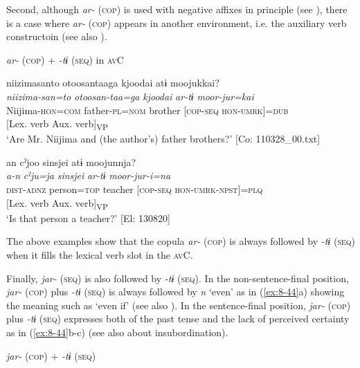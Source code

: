   Second, although \textit{ar-} (\textsc{cop}) is used with negative affixes in principle (see ), there is a case where \textit{ar-} (\textsc{cop}) appears in another environment, i.e. the auxiliary verb constructoin (see also ).

\ea\label{ex:8-43}
  \textit{ar-} (\textsc{cop}) + \textit{-tɨ} (\textsc{seq}) in \textsc{av}C

\ea
{\US}
\gllll   {\textbar}niizimasanto  otoosan{\textbar}taaga  {\textbar}kjoodai{\textbar}  atɨ  moojukkai?\\
\textit{niizima-san=to}  \textit{otoosan-taa=ga}  \textit{kjoodai}  \textit{ar-tɨ}  \textit{moor-jur=kai}\\
Niijima-\textsc{hon}=\textsc{com}  father-\textsc{pl}=\textsc{nom}  brother  [\textsc{cop}-\textsc{seq}  \textsc{hon}-\textsc{umrk}]=\textsc{dub}\\
            {}[Lex. verb  Aux. verb]\textsubscript{VP}\\
\glt ‘Are Mr. Niijima and (the author’s) father brothers?’ [Co: 110328\_00.txt]

\ex
{\TM}
\gllll  an  cˀjoo  sinsjei  atɨ  moojunnja?\\
\textit{a-n}  \textit{cˀju=ja}  \textit{sinsjei}  \textit{ar-tɨ}  \textit{moor-jur-i=na}\\
\textsc{dist}-\textsc{adnz}  person=\textsc{top}  teacher  [\textsc{cop}-\textsc{seq}  \textsc{hon}-\textsc{umrk}-\textsc{npst}]=\textsc{plq}\\
            {}[Lex. verb  Aux. verb]\textsubscript{VP}\\
\glt ‘Is that person a teacher?’ [El: 130820]

The above examples show that the copula \textit{ar-} (\textsc{cop}) is always followed by \textit{-tɨ} (\textsc{seq}) when it fills the lexical verb slot in the \textsc{av}C.

  Finally, \textit{jar-} (\textsc{seq}) is also followed by \textit{-tɨ} (\textsc{seq}). In the non-sentence-final position, \textit{jar-} (\textsc{cop}) plus \textit{-tɨ} (\textsc{seq}) is always followed by \textit{n} ‘even’ as in (\ref{ex:8-44}a) showing the meaning such as ‘even if’ (see also ). In the sentence-final position, \textit{jar-} (\textsc{cop}) plus \textit{-tɨ} (\textsc{seq}) expresses both of the past tense and the lack of perceived certainty as in (\ref{ex:8-44}b-c) (see also  about insubordination).

\ea\label{ex:8-44}
  \textit{jar-} (\textsc{cop}) + \textit{-tɨ} (\textsc{seq})

